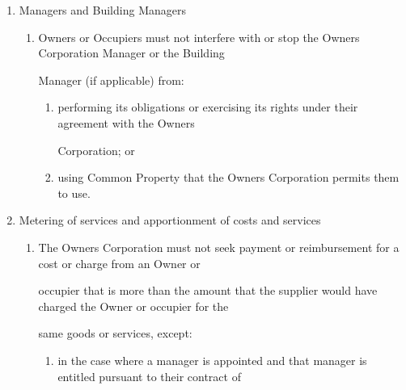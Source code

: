 \documentclass{article}
\begin{document}
\begin{enumerate}[label=\arabic*.]
\begin{enumerate}[label=\arabic{enumi}.\arabic*.]
\begin{enumerate}[label=(\arabic*)]
\begin{enumerate}[label=(\alph*)]
{\fontsize{9.962}{1}(ii) these Rules; or }

{\fontsize{9.962}{1}(iii) any insurance policy on the Development or the Common Property. }

\end{enumerate}
\item {\fontsize{9.962}{1} An Owner or Occupier must reimburse the Owners Corporation on demand for an increase in insurance }

{\fontsize{10.02}{1}premium resulting from any consent given to, or act or neglect by the Owner or Occupier. }

\end{enumerate}
\item {\fontsize{9.99}{1} Managers and Building Managers }

\begin{enumerate}[label=(\arabic*)]
\item {\fontsize{9.962}{1} Owners or Occupiers must not interfere with or stop the Owners Corporation Manager or the Building }

{\fontsize{10.02}{1}Manager (if applicable) from: }

\begin{enumerate}[label=(\alph*)]
\item {\fontsize{9.962}{1} performing its obligations or exercising its rights under their agreement with the Owners }

{\fontsize{10.02}{1}Corporation; or }

\item {\fontsize{9.962}{1} using Common Property that the Owners Corporation permits them to use. }

\end{enumerate}
\end{enumerate}
\item {\fontsize{9.99}{1} Metering of services and apportionment of costs and services }

\begin{enumerate}[label=(\arabic*)]
\item {\fontsize{9.962}{1} The Owners Corporation must not seek payment or reimbursement for a cost or charge from an Owner or }

{\fontsize{10.02}{1}occupier that is more than the amount that the supplier would have charged the Owner or occupier for the }

{\fontsize{10.02}{1}same goods or services, except: }

\begin{enumerate}[label=(\alph*)]
\item {\fontsize{9.962}{1} in the case where a manager is appointed and that manager is entitled pursuant to their contract of }


\end{enumerate}
\end{enumerate}
\end{enumerate}
\end{enumerate}
\end{document}

